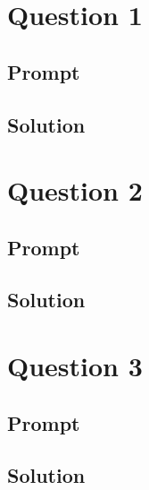 \documentclass[a4paper]{article}
\begin{document}

\tableofcontents
\newcommand{\sectionbreak}{\clearpage} %


\section{Question 1}
\subsection{Prompt}

\subsection{Solution}


\section{Question 2}
\subsection{Prompt}

\subsection{Solution}


\section{Question 3}
\subsection{Prompt}

\subsection{Solution}
\end{document}
